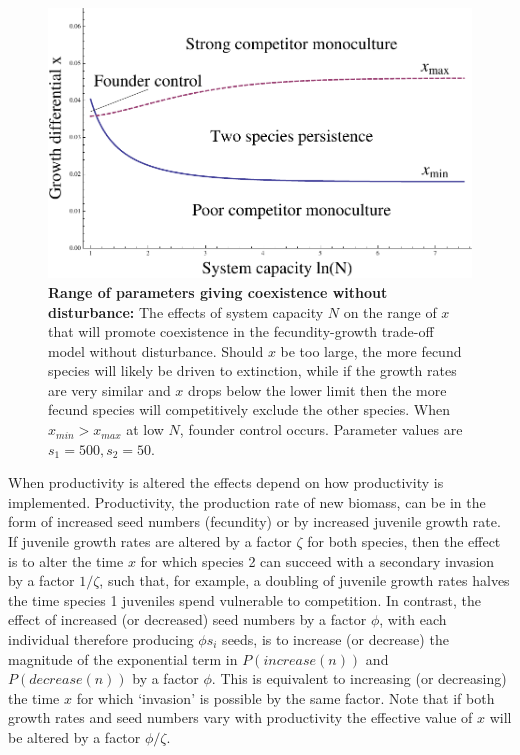 \begin{figure}
  \includegraphics[width=4.5in]{xrangeofcoexist}
   \caption[Range of parameters giving coexistence without disturbance]{\textbf{Range of parameters giving coexistence without disturbance:} The effects of system capacity $N$ on the range of $x$ that will promote coexistence in the fecundity-growth trade-off model without disturbance. Should $x$ be too large, the more fecund species will likely be driven to extinction, while if the growth rates are very similar and $x$ drops below the lower limit then the more fecund species will competitively exclude the other species. When $x_{min}>x_{max}$ at low $N$, founder control occurs. Parameter values are $s_1=500,s_2=50$.}
 \label{fig:systemsize}
\end{figure}

When productivity is altered the effects depend on how productivity is implemented. Productivity, the production rate of new biomass, can be in the form of increased seed numbers (fecundity) or by increased juvenile growth rate. If juvenile growth rates are altered by a factor $\zeta$ for both species, then the effect is to alter the time $x$ for which species 2 can succeed with a secondary invasion by a factor $1/\zeta$, such that, for example, a doubling of juvenile growth rates halves the time species 1 juveniles spend vulnerable to competition.  In contrast, the effect of increased (or decreased) seed numbers by a factor $\phi$, with each individual therefore producing $\phi s_i$ seeds, is to increase (or decrease) the magnitude of the exponential term in $P(increase(n))$ and $P(decrease(n))$ by a factor $\phi$. This is equivalent to increasing (or decreasing) the time $x$ for which `invasion' is possible by the same factor. Note that if both growth rates and seed numbers vary with productivity the effective value of $x$ will be altered by a factor $\phi / \zeta$.

